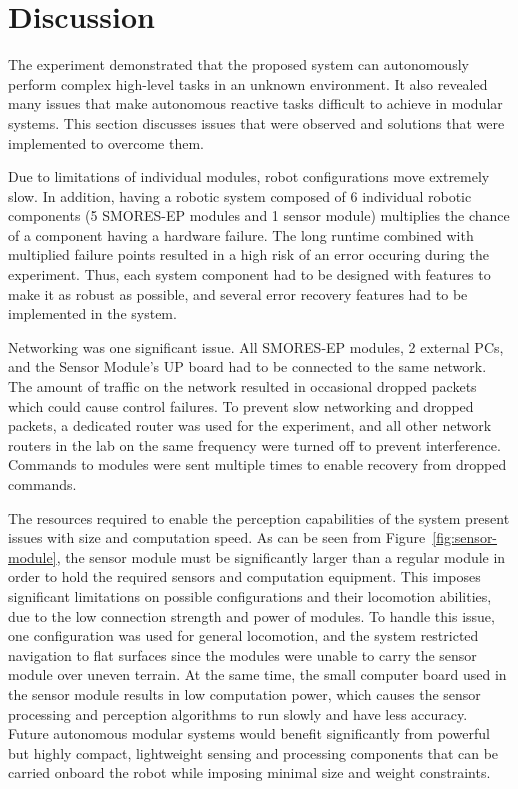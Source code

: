 \documentclass[conference]{IEEEtran}
\begin{document}
\section{Discussion}
\label{sec:discussion}
%
The experiment demonstrated that the proposed system can autonomously perform complex high-level tasks in an unknown environment. It also revealed many issues that make autonomous reactive tasks difficult to achieve in modular systems. This section discusses issues that were observed and solutions that were implemented to overcome them.

Due to limitations of individual modules, robot configurations move extremely slow. In addition, having a robotic system composed of 6 individual robotic components (5 SMORES-EP modules and 1 sensor module) multiplies the chance of a component having a hardware failure. The long runtime combined with multiplied failure points resulted in a high risk of an error occuring during the experiment. Thus, each system component had to be designed with features to make it as robust as possible, and several error recovery features had to be implemented in the system.

Networking was one significant issue. All SMORES-EP modules, 2 external PCs, and the Sensor Module's UP board had to be connected to the same network. The amount of traffic on the network resulted in occasional dropped packets which could cause control failures. To prevent slow networking and dropped packets, a dedicated router was used for the experiment, and all other network routers in the lab on the same frequency were turned off to prevent interference. Commands to modules were sent multiple times to enable recovery from dropped commands.

The resources required to enable the perception capabilities of the system present issues with size and computation speed. As can be seen from Figure~\ref{fig:sensor-module}, the sensor module must be significantly larger than a regular module in order to hold the required sensors and computation equipment. This imposes significant limitations on possible configurations and their locomotion abilities, due to the low connection strength and power of modules. To handle this issue, one configuration was used for general locomotion, and the system restricted navigation to flat surfaces since the modules were unable to carry the sensor module over uneven terrain. At the same time, the small computer board used in the sensor module results in low computation power, which causes the sensor processing and perception algorithms to run slowly and have less accuracy. Future autonomous modular systems would benefit significantly from powerful but highly compact, lightweight sensing and processing components that can be carried onboard the robot while imposing minimal size and weight constraints.
\end{document}
